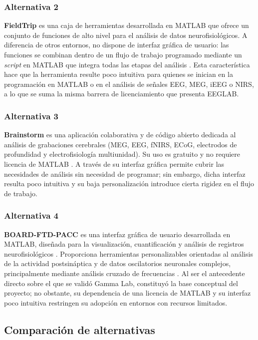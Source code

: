 \documentclass[12pt,letterpaper,oneside]{article}
\begin{document}
\subsubsection{Alternativa 2}
\textbf{FieldTrip} es una caja de herramientas desarrollada en MATLAB que ofrece un conjunto de funciones de alto nivel para el análisis de datos neurofisiológicos. A diferencia de otros entornos, no dispone de interfaz gráfica de usuario: las funciones se combinan dentro de un flujo de trabajo programado mediante un \textit{script} en MATLAB que integra todas las etapas del análisis \cite{fieldtrip}. Esta característica hace que la herramienta resulte poco intuitiva para quienes se inician en la programación en MATLAB o en el análisis de señales EEG, MEG, iEEG o NIRS, a lo que se suma la misma barrera de licenciamiento que presenta EEGLAB.


\subsubsection{Alternativa 3}
\textbf{Brainstorm} es una aplicación colaborativa y de código abierto dedicada al análisis de grabaciones cerebrales (MEG, EEG, fNIRS, ECoG, electrodos de profundidad y electrofisiología multiunidad). Su uso es gratuito y no requiere licencia de MATLAB \cite{brainstorm}. A través de su interfaz gráfica permite cubrir las necesidades de análisis sin necesidad de programar; sin embargo, dicha interfaz resulta poco intuitiva y su baja personalización introduce cierta rigidez en el flujo de trabajo.


\subsubsection{Alternativa 4}
\textbf{BOARD-FTD-PACC} es una interfaz gráfica de usuario desarrollada en MATLAB, diseñada para la visualización, cuantificación y análisis de registros neurofisiológicos \cite{gauthier2023}. Proporciona herramientas personalizables orientadas al análisis de la actividad postsináptica y de datos oscilatorios neuronales complejos, principalmente mediante análisis cruzado de frecuencias \cite{gauthier2023}. Al ser el antecedente directo sobre el que se validó Gamma Lab, constituyó la base conceptual del proyecto; no obstante, su dependencia de una licencia de MATLAB y su interfaz poco intuitiva restringen su adopción en entornos con recursos limitados.


\subsection{Comparación de alternativas}
\end{document}
